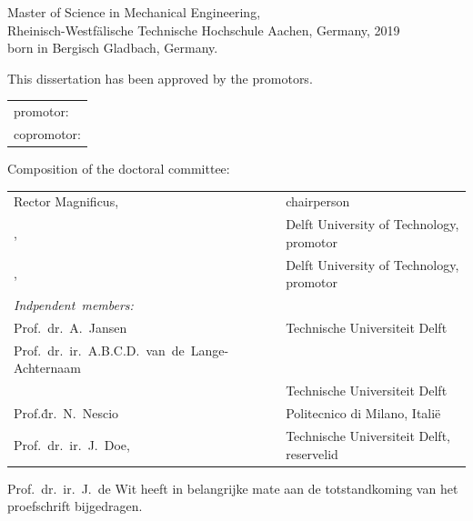 \begin{titlepage}
\begin{center}
\bigskip
\bigskip

Master of Science in Mechanical Engineering, \\
Rheinisch-Westfälische Technische Hochschule Aachen,
Germany, 2019 \\
born in Bergisch Gladbach, Germany.

\vspace*{2\bigskipamount}

\end{center}

\clearpage
\thispagestyle{empty}

\noindent This dissertation has been approved by the
promotors.

\medskip\noindent
\begin{tabular}{l}
    promotor: \promotor{} \\
    copromotor: \copromotor{}
\end{tabular}

\bigskip
\noindent Composition of the doctoral committee:

\medskip\noindent
\begin{tabular}{p{3cm}l}
    Rector Magnificus, & chairperson\\
    \promotor{}, & Delft University of Technology, promotor \\
    \copromotor{}, & Delft University of Technology, promotor \\

    \medskip
    \mbox{\emph{Indpendent members:}} & \\

    Prof.\ dr.\ A.\ Jansen & Technische Universiteit Delft \\
    \mbox{Prof.\ dr.\ ir.\ A.B.C.D.\ van de Lange-Achternaam} & \\
      & Technische Universiteit Delft \\
    Prof.\.dr.\ N.\ Nescio & Politecnico di Milano, Itali\"e \\
    Prof.\ dr.\ ir.\ J.\ Doe, & Technische Universiteit Delft, reservelid \\

\end{tabular}

\medskip
\noindent Prof.\ dr.\ ir.\ J.\ de Wit heeft in belangrijke mate aan de totstandkoming van het proefschrift bijgedragen.


\end{titlepage}
